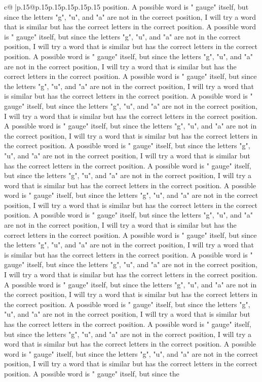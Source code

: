 \documentclass{article}
\begin{document}
{\begin{supertabular}{c@{$\;$}|p{.15\linewidth}@{}p{.15\linewidth}p{.15\linewidth}p{.15\linewidth}p{.15\linewidth}p{.15\linewidth}}
{{{position. A possible word is " gauge" itself, but since the letters "g", "u", and "a" are not in the correct position, I will try a word that is similar but has the correct letters in the correct position. A possible word is " gauge" itself, but since the letters "g", "u", and "a" are not in the correct position, I will try a word that is similar but has the correct letters in the correct position. A possible word is " gauge" itself, but since the letters "g", "u", and "a" are not in the correct position, I will try a word that is similar but has the correct letters in the correct position. A possible word is " gauge" itself, but since the letters "g", "u", and "a" are not in the correct position, I will try a word that is similar but has the correct letters in the correct position. A possible word is " gauge" itself, but since the letters "g", "u", and "a" are not in the correct position, I will try a word that is similar but has the correct letters in the correct position. A possible word is " gauge" itself, but since the letters "g", "u", and "a" are not in the correct position, I will try a word that is similar but has the correct letters in the correct position. A possible word is " gauge" itself, but since the letters "g", "u", and "a" are not in the correct position, I will try a word that is similar but has the correct letters in the correct position. A possible word is " gauge" itself, but since the letters "g", "u", and "a" are not in the correct position, I will try a word that is similar but has the correct letters in the correct position. A possible word is " gauge" itself, but since the letters "g", "u", and "a" are not in the correct position, I will try a word that is similar but has the correct letters in the correct position. A possible word is " gauge" itself, but since the letters "g", "u", and "a" are not in the correct position, I will try a word that is similar but has the correct letters in the correct position. A possible word is " gauge" itself, but since the letters "g", "u", and "a" are not in the correct position, I will try a word that is similar but has the correct letters in the correct position. A possible word is " gauge" itself, but since the letters "g", "u", and "a" are not in the correct position, I will try a word that is similar but has the correct letters in the correct position. A possible word is " gauge" itself, but since the letters "g", "u", and "a" are not in the correct position, I will try a word that is similar but has the correct letters in the correct position. A possible word is " gauge" itself, but since the letters "g", "u", and "a" are not in the correct position, I will try a word that is similar but has the correct letters in the correct position. A possible word is " gauge" itself, but since the letters "g", "u", and "a" are not in the correct position, I will try a word that is similar but has the correct letters in the correct position. A possible word is " gauge" itself, but since the letters "g", "u", and "a" are not in the correct position, I will try a word that is similar but has the correct letters in the correct position. A possible word is " gauge" itself, but since the }}}
\end{supertabular}}
\end{document}
